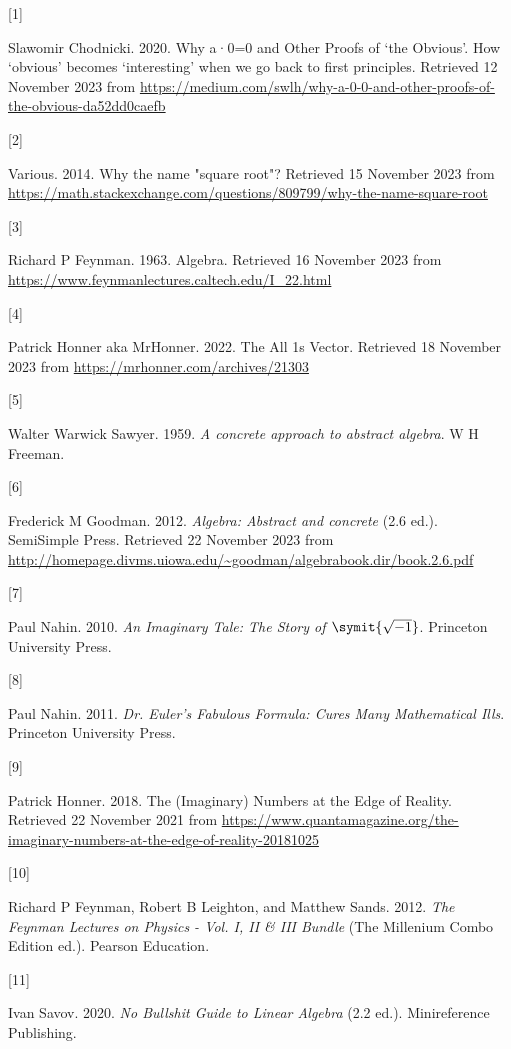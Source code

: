 \documentclass[
  a4paper,
]{article}
\newlength{\cslhangindent}
\newlength{\csllabelwidth}
\newlength{\cslentryspacingunit} %
\newenvironment{CSLReferences}[2] %
 {%
  \setlength{\parindent}{0pt}
  \ifodd #1
  \let\oldpar\par
  \def\par{\hangindent=\cslhangindent\oldpar}
  \fi
  \setlength{\parskip}{#2\cslentryspacingunit}
 }%
 {}
\newcommand{\CSLLeftMargin}[1]{\parbox[t]{\csllabelwidth}{#1}}
\newcommand{\CSLRightInline}[1]{\parbox[t]{\linewidth - \csllabelwidth}{#1}\break}
\begin{document}
\hypertarget{refs}{}
\begin{CSLReferences}{0}{0}
\leavevmode{}%
\CSLLeftMargin{{[}1{]} }%
\CSLRightInline{Slawomir Chodnicki. 2020. {Why a·0=0 and Other Proofs of
{`the Obvious'}}. {How {`obvious'} becomes {`interesting'} when we go
back to first principles}. Retrieved 12 November 2023 from
\url{https://medium.com/swlh/why-a-0-0-and-other-proofs-of-the-obvious-da52dd0caefb}}

\leavevmode{}%
\CSLLeftMargin{{[}2{]} }%
\CSLRightInline{Various. 2014. {Why the name "square root"?} Retrieved
15 November 2023 from
\url{https://math.stackexchange.com/questions/809799/why-the-name-square-root}}

\leavevmode{}%
\CSLLeftMargin{{[}3{]} }%
\CSLRightInline{Richard P Feynman. 1963. Algebra. Retrieved 16 November
2023 from \url{https://www.feynmanlectures.caltech.edu/I_22.html}}

\leavevmode{}%
\CSLLeftMargin{{[}4{]} }%
\CSLRightInline{Patrick Honner aka MrHonner. 2022. {The All 1s Vector}.
Retrieved 18 November 2023 from
\url{https://mrhonner.com/archives/21303}}

\leavevmode{}%
\CSLLeftMargin{{[}5{]} }%
\CSLRightInline{Walter Warwick Sawyer. 1959. \emph{A concrete approach
to abstract algebra}. W H Freeman.}

\leavevmode{}%
\CSLLeftMargin{{[}6{]} }%
\CSLRightInline{Frederick M Goodman. 2012. \emph{Algebra: Abstract and
concrete} (2.6 ed.). SemiSimple Press. Retrieved 22 November 2023 from
\url{http://homepage.divms.uiowa.edu/~goodman/algebrabook.dir/book.2.6.pdf}}

\leavevmode{}%
\CSLLeftMargin{{[}7{]} }%
\CSLRightInline{Paul Nahin. 2010. \emph{{An Imaginary Tale: The Story of
\(\symit{\sqrt{-1}}\)}}. Princeton University Press.}

\leavevmode{}%
\CSLLeftMargin{{[}8{]} }%
\CSLRightInline{Paul Nahin. 2011. \emph{{Dr. Euler's Fabulous Formula:
Cures Many Mathematical Ills}}. Princeton University Press.}

\leavevmode{}%
\CSLLeftMargin{{[}9{]} }%
\CSLRightInline{Patrick Honner. 2018. {The (Imaginary) Numbers at the
Edge of Reality}. Retrieved 22 November 2021 from
\url{https://www.quantamagazine.org/the-imaginary-numbers-at-the-edge-of-reality-20181025}}

\leavevmode{}%
\CSLLeftMargin{{[}10{]} }%
\CSLRightInline{Richard P Feynman, Robert B Leighton, and Matthew Sands.
2012. \emph{{The Feynman Lectures on Physics - Vol. I, II \& III
Bundle}} (The Millenium Combo Edition ed.). Pearson Education.}

\leavevmode{}%
\CSLLeftMargin{{[}11{]} }%
\CSLRightInline{Ivan Savov. 2020. \emph{{No Bullshit Guide to Linear
Algebra}} (2.2 ed.). Minireference Publishing.}

\end{CSLReferences}
\end{document}
